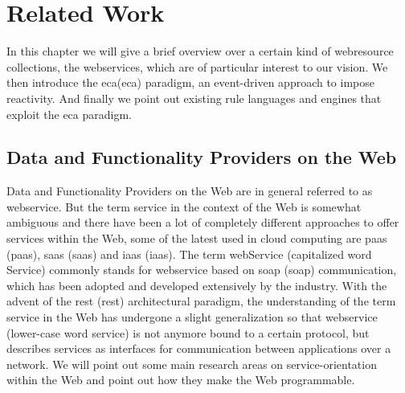 
\chapter{Related Work}

In this chapter we will give a brief overview over a certain kind of \textrm{\gls{webresource}} collections, the \textrm{\glspl{webservice}}, which are of particular interest to our vision.
We then introduce the \textrm{\acrlong{eca}(\acrshort{eca})} paradigm, an event-driven approach to impose reactivity.
And finally we point out existing rule languages and engines that exploit the \textrm{\acrshort{eca}} paradigm.



\section{Data and Functionality Providers on the Web}
Data and Functionality Providers on the Web are in general referred to as \textrm{\gls{webservice}}.
But the term service in the context of the Web is somewhat ambiguous and there have been a lot of completely different approaches to offer services within the Web, some of the latest used in cloud computing are \textrm{\acrlong{paas} (\acrshort{paas})}, \textrm{\acrlong{saas} (\acrshort{saas})} and \textrm{\acrlong{iaas} (\acrshort{iaas})}.
The term \textrm{\gls{webService}} (capitalized word \textrm{Service}) commonly stands for \textrm{\gls{webservice}} based on \textrm{\acrlong{soap} (\acrshort{soap})} communication\cite{journals/itpro/BarrosD06}, which has been adopted and developed extensively by the industry.
With the advent of the \textrm{\acrlong{rest} (\acrshort{rest})} architectural paradigm, the understanding of the term service in the Web has undergone a slight generalization so that \textrm{\gls{webservice}} (lower-case word \textrm{service}) is not anymore bound to a certain protocol, but describes services as interfaces for communication between applications over a network\cite{richardson2008restful}.
We will point out some main research areas on service-orientation within the Web and point out how they make the Web programmable.

